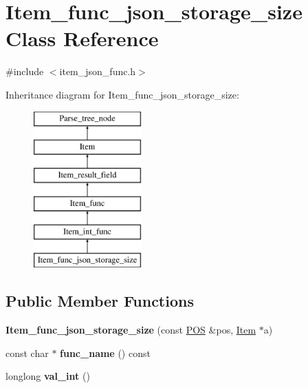 \hypertarget{classItem__func__json__storage__size}{}\section{Item\+\_\+func\+\_\+json\+\_\+storage\+\_\+size Class Reference}
\label{classItem__func__json__storage__size}


{\ttfamily \#include $<$item\+\_\+json\+\_\+func.\+h$>$}

Inheritance diagram for Item\+\_\+func\+\_\+json\+\_\+storage\+\_\+size\+:\begin{figure}[H]
\begin{center}
\leavevmode
\includegraphics[height=6.000000cm]{classItem__func__json__storage__size}
\end{center}
\end{figure}
\subsection*{Public Member Functions}
\begin{DoxyCompactItemize}
\item 
\mbox{\label{classItem__func__json__storage__size_a037e65089c056a1fa779adf05cb1f4c1}} 
{\bfseries Item\+\_\+func\+\_\+json\+\_\+storage\+\_\+size} (const \mbox{\hyperlink{structYYLTYPE}{P\+OS}} \&pos, \mbox{\hyperlink{classItem}{Item}} $\ast$a)
\item 
\mbox{\label{classItem__func__json__storage__size_aa22782e0e3e916d0f0b409481e27ab3e}} 
const char $\ast$ {\bfseries func\+\_\+name} () const
\item 
\mbox{\label{classItem__func__json__storage__size_aefe71201874ff144533e6f28f9323ce8}} 
longlong {\bfseries val\+\_\+int} ()
\end{DoxyCompactItemize}
